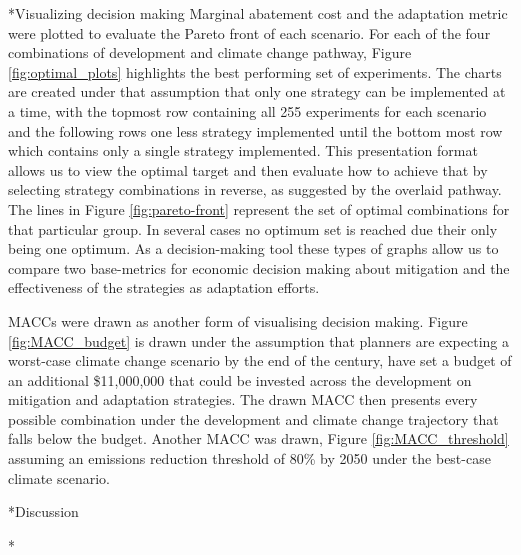 \documentclass[twocolumn, a4paper,10pt]{article}
\makeatletter
\renewcommand\section{\@startsection{section}{1}{\z@}{3pt}{3pt}{\normalfont\large\bfseries}}
\renewcommand\subsection{\@startsection{subsection}{1}{\z@}{\z@}{\z@}{\normalfont\normalsize\bfseries}}
\renewcommand\subsection{\@startsection{subsection}{1}{\z@}{\z@}{0.1pt}{\normalfont\normalsize\bfseries}}
\makeatother
\begin{document}
\subsection*{Visualizing decision making}
Marginal abatement cost and the adaptation metric were plotted to evaluate the Pareto front of each scenario. For each of the four combinations of development and climate change pathway, Figure \ref{fig:optimal_plots} highlights the best performing set of experiments. The charts are created under that assumption that only one strategy can be implemented at a time, with the topmost row containing all 255 experiments for each scenario and the following rows one less strategy implemented until the bottom most row which contains only a single strategy implemented. This presentation format allows us to view the optimal target and then evaluate how to achieve that by selecting strategy combinations in reverse, as suggested by the overlaid pathway. The lines in Figure \ref{fig:pareto-front} represent the set of optimal combinations for that particular group. In several cases no optimum set is reached due their only being one optimum. As a decision-making tool these types of graphs allow us to compare two base-metrics for economic decision making about mitigation and the effectiveness of the strategies as adaptation efforts.

MACCs were drawn as another form of visualising decision making. Figure \ref{fig:MACC_budget} is drawn under the assumption that planners are expecting a worst-case climate change scenario by the end of the century, have set a budget of an additional \$11,000,000 that could be invested across the development on mitigation and adaptation strategies. The drawn MACC then presents every possible combination under the development and climate change trajectory that falls below the budget. Another MACC was drawn, Figure \ref{fig:MACC_threshold} assuming an emissions reduction threshold of 80\% by 2050 under the best-case climate scenario. 




\section*{Discussion}

\subsection*{}
\end{document}
